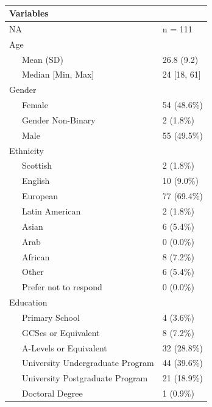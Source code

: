 \documentclass[
  english,
  man]{apa6}
\begin{document}
\begin{table}[tbp]

\begin{center}
\begin{threeparttable}

\caption{\label{tab:unnamed-chunk-1}}

\begin{tabular}{ll}
\toprule
Variables & \\
\midrule
NA & n = 111\\
Age & \\
\ \ \ Mean (SD) & 26.8 (9.2)\\
\ \ \ Median [Min, Max] & 24 [18, 61]\\
Gender & \\
\ \ \ Female & 54 (48.6\%)\\
\ \ \ Gender Non-Binary & 2 (1.8\%)\\
\ \ \ Male & 55 (49.5\%)\\
Ethnicity & \\
\ \ \ Scottish & 2 (1.8\%)\\
\ \ \ English & 10 (9.0\%)\\
\ \ \ European & 77 (69.4\%)\\
\ \ \ Latin American & 2 (1.8\%)\\
\ \ \ Asian & 6 (5.4\%)\\
\ \ \ Arab & 0 (0.0\%)\\
\ \ \ African & 8 (7.2\%)\\
\ \ \ Other & 6 (5.4\%)\\
\ \ \ Prefer not to respond & 0 (0.0\%)\\
Education & \\
\ \ \ Primary School & 4 (3.6\%)\\
\ \ \ GCSes or Equivalent & 8 (7.2\%)\\
\ \ \ A-Levels or Equivalent & 32 (28.8\%)\\
\ \ \ University Undergraduate Program & 44 (39.6\%)\\
\ \ \ University Postgraduate Program & 21 (18.9\%)\\
\ \ \ Doctoral Degree & 1 (0.9\%)\\
\bottomrule
\end{tabular}

\end{threeparttable}
\end{center}

\end{table}
\end{document}
